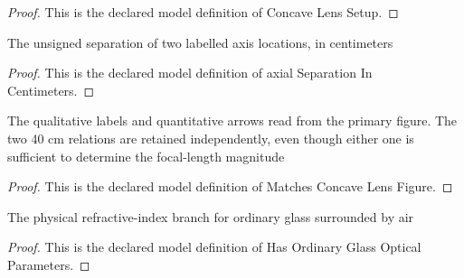 \begin{proof}
  This is the declared model definition of Concave Lens Setup.
\end{proof}
\begin{definition}
  \label{def:physics:phyx-mini-0066:phyxminiproblems-problemphyxmini0066-axialseparationincentimeters}
  The unsigned separation of two labelled axis locations, in centimeters
\end{definition}
\begin{proof}
  This is the declared model definition of axial Separation In Centimeters.
\end{proof}
\begin{definition}
  \label{def:physics:phyx-mini-0066:phyxminiproblems-problemphyxmini0066-matchesconcavelensfigure}
  The qualitative labels and quantitative arrows read from the primary figure. The two 40 cm relations are retained independently, even though either one is sufficient to determine the focal-length magnitude
\end{definition}
\begin{proof}
  This is the declared model definition of Matches Concave Lens Figure.
\end{proof}
\begin{definition}
  \label{def:physics:phyx-mini-0066:phyxminiproblems-problemphyxmini0066-hasordinaryglassopticalparameters}
  The physical refractive-index branch for ordinary glass surrounded by air
\end{definition}
\begin{proof}
  This is the declared model definition of Has Ordinary Glass Optical Parameters.
\end{proof}
